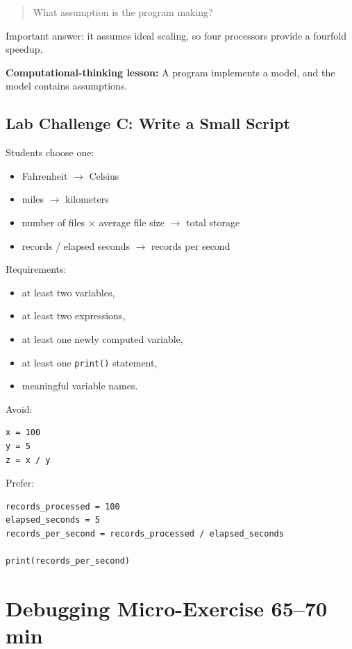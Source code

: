 \documentclass[11pt]{article}
\begin{document}
\begin{quote}
What assumption is the program making?
\end{quote}

Important answer: it assumes ideal scaling, so four processors provide a fourfold speedup.

\textbf{Computational-thinking lesson:} A program implements a model, and the model contains assumptions.

\subsection*{Lab Challenge C: Write a Small Script}

Students choose one:

\begin{itemize}
    \item Fahrenheit $\rightarrow$ Celsius
    \item miles $\rightarrow$ kilometers
    \item number of files $\times$ average file size $\rightarrow$ total storage
    \item records / elapsed seconds $\rightarrow$ records per second
\end{itemize}

Requirements:

\begin{itemize}
    \item at least two variables,
    \item at least two expressions,
    \item at least one newly computed variable,
    \item at least one \texttt{print()} statement,
    \item meaningful variable names.
\end{itemize}

Avoid:

\begin{lstlisting}
x = 100
y = 5
z = x / y
\end{lstlisting}

Prefer:

\begin{lstlisting}
records_processed = 100
elapsed_seconds = 5
records_per_second = records_processed / elapsed_seconds

print(records_per_second)
\end{lstlisting}

\section{Debugging Micro-Exercise \hfill 65--70 min}
\end{document}
